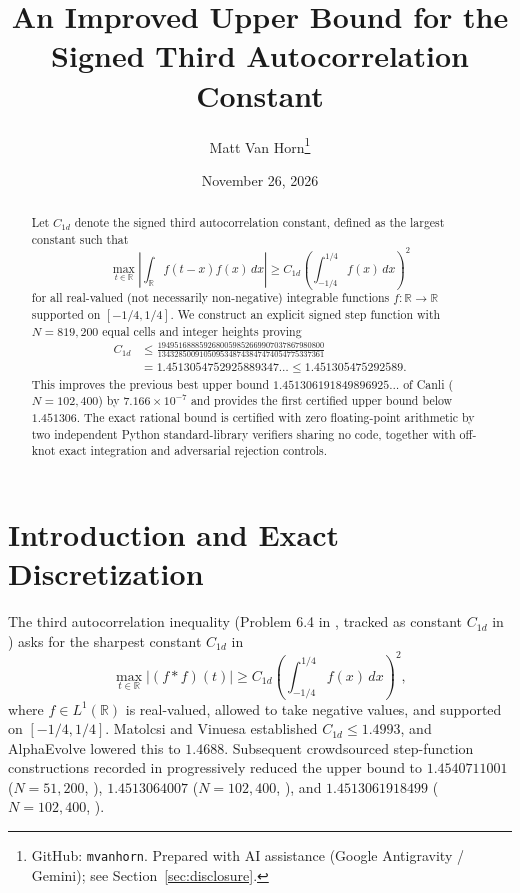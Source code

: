 \documentclass[11pt]{article}
\title{An Improved Upper Bound for the Signed Third Autocorrelation Constant}
\author{Matt Van Horn\thanks{GitHub: \texttt{mvanhorn}. Prepared with AI assistance (Google Antigravity / Gemini); see Section~\ref{sec:disclosure}.}}
\date{November 26, 2026}
\begin{document}
\maketitle

\begin{abstract}
Let $C_{1d}$ denote the signed third autocorrelation constant, defined as the largest constant such that
\[
  \max_{t \in \mathbb{R}} \left|\int_{\mathbb{R}} f(t-x) f(x)\,dx\right| \ge C_{1d} \left(\int_{-1/4}^{1/4} f(x)\,dx\right)^2
\]
for all real-valued (not necessarily non-negative) integrable functions $f \colon \mathbb{R} \to \mathbb{R}$ supported on $[-1/4, 1/4]$. We construct an explicit signed step function with $N = 819{,}200$ equal cells and integer heights proving
\begin{align*}
  C_{1d} &\le \frac{1949516888592680059852669907037867980800}{1343285009105095348743847474054775337361} \\
         &= 1.4513054752925889347\ldots \le 1.451305475292589.
\end{align*}
This improves the previous best upper bound $1.451306191849896925\ldots$ of Canli ($N = 102{,}400$) by $7.166 \times 10^{-7}$ and provides the first certified upper bound below $1.451306$. The exact rational bound is certified with zero floating-point arithmetic by two independent Python standard-library verifiers sharing no code, together with off-knot exact integration and adversarial rejection controls.
\end{abstract}

\section{Introduction and Exact Discretization}

The third autocorrelation inequality (Problem 6.4 in \cite{GGSWT2025}, tracked as constant $C_{1d}$ in \cite{Tao2026}) asks for the sharpest constant $C_{1d}$ in
\begin{equation}\label{eq:c1d}
  \max_{t \in \mathbb{R}} |(f * f)(t)| \ge C_{1d} \left(\int_{-1/4}^{1/4} f(x)\,dx\right)^2,
\end{equation}
where $f \in L^1(\mathbb{R})$ is real-valued, allowed to take negative values, and supported on $[-1/4, 1/4]$. Matolcsi and Vinuesa \cite{MV2010} established $C_{1d} \le 1.4993$, and AlphaEvolve \cite{GGSWT2025} lowered this to $1.4688$. Subsequent crowdsourced step-function constructions recorded in \cite{Tao2026} progressively reduced the upper bound to $1.4540711001$ ($N = 51{,}200$, \cite{REV2026}), $1.4513064007$ ($N = 102{,}400$, \cite{WEILL2026}), and $1.4513061918499$ ($N = 102{,}400$, \cite{Can2026b}).
\end{document}
